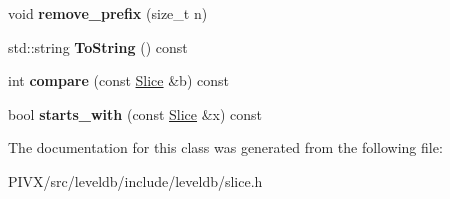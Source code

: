 \begin{DoxyCompactItemize}
void {\bfseries remove\+\_\+prefix} (size\+\_\+t n)
\item 
\mbox{\label{classleveldb_1_1_slice_a10ab05e2c2358bb6e6b6d49bf69d72ce}} 
std\+::string {\bfseries To\+String} () const
\item 
\mbox{\label{classleveldb_1_1_slice_a1ec69137e5cee9ef34c5c4fca3c62957}} 
int {\bfseries compare} (const \mbox{\hyperlink{classleveldb_1_1_slice}{Slice}} \&b) const
\item 
\mbox{\label{classleveldb_1_1_slice_ae1c0a7f51a18a83bbeebfb300bf23767}} 
bool {\bfseries starts\+\_\+with} (const \mbox{\hyperlink{classleveldb_1_1_slice}{Slice}} \&x) const
\end{DoxyCompactItemize}


The documentation for this class was generated from the following file\+:\begin{DoxyCompactItemize}
\item 
P\+I\+V\+X/src/leveldb/include/leveldb/slice.\+h\end{DoxyCompactItemize}
